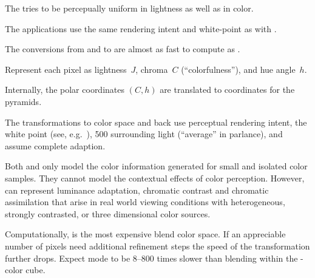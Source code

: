 \begin{description}
  The  tries to be percepually uniform
  in lightness as well as in color.

  The applications use the same rendering intent and white-point as with .

  The conversions from and to  are almost as fast to compute as
  .

\item[\urlmark{\wikipediaciecam}{\acronym{CIECAM02}}]\itemend\urltext
  Represent each pixel as lightness~$J$, chroma~$C$ (``colorfulness''), and hue
  angle~$h$.

  \begin{geeknote}
    Internally, the polar coordinates $(C, h)$ are translated to 
    coordinates for the pyramids.
  \end{geeknote}

  The transformations to
   color space and back use
  perceptual rendering intent, the
   white point (see,
  e.g.\ ), 500 surrounding
  light (``average'' in  parlance), and assume complete adaption.

  Both  and  only model the color information generated for
  small and isolated color samples.  They cannot model the contextual effects of color
  perception.  However,  can represent luminance adaptation, chromatic
  contrast and chromatic assimilation that arise in real world viewing conditions with
  heterogeneous, strongly contrasted, or three dimensional color sources.

  Computationally,  is the most expensive blend color space.  If an
  appreciable number of pixels need additional refinement steps the speed of the transformation
  further drops.  Expect  mode to be 8--800 times slower than blending within
  the -color cube.
\end{description}

